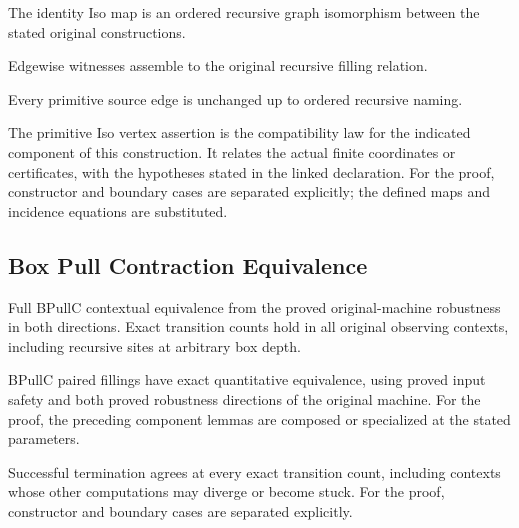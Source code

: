 The identity Iso map is an ordered recursive graph isomorphism between the stated original constructions.
\par{}

Edgewise witnesses assemble to the original recursive filling relation.
\par{}

Every primitive source edge is unchanged up to ordered recursive naming.
\par{}

The primitive Iso vertex assertion is the compatibility law for the indicated component of this construction. It relates the actual finite coordinates or certificates, with the hypotheses stated in the linked declaration.
For the proof, constructor and boundary cases are separated explicitly; the defined maps and incidence equations are substituted.
\par{}

\subsection{Box Pull Contraction Equivalence}
Full BPullC contextual equivalence from the proved original-machine robustness in both directions. Exact transition counts hold in all original observing contexts, including recursive sites at arbitrary box depth.

BPullC paired fillings have exact quantitative equivalence, using proved input safety and both proved robustness directions of the original machine.
For the proof, the preceding component lemmas are composed or specialized at the stated parameters.
\par{}

Successful termination agrees at every exact transition count, including contexts whose other computations may diverge or become stuck.
For the proof, constructor and boundary cases are separated explicitly.
\par{}

